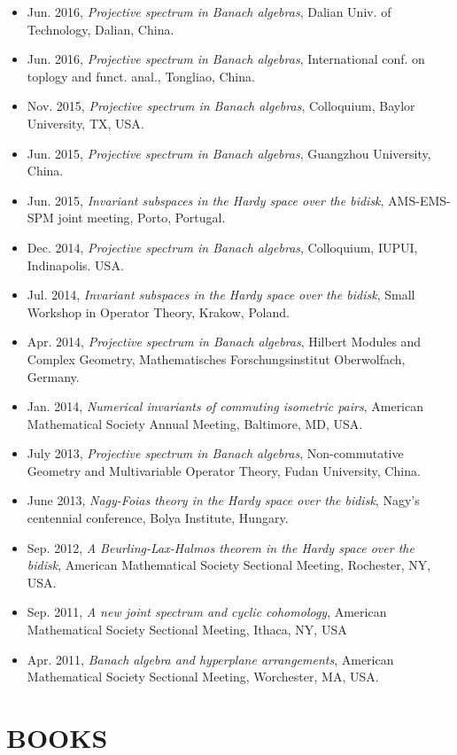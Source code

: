 \documentclass[12pt]{res} %
\begin{document}
\begin{resume}
\begin{itemize}
\item Jun. 2016, {\em Projective spectrum in Banach algebras}, Dalian Univ. of Technology, Dalian, China.
\item Jun. 2016, {\em Projective spectrum in Banach algebras}, International conf. on toplogy and funct. anal., Tongliao, China.
\item Nov. 2015, {\em Projective spectrum in Banach algebras}, Colloquium, Baylor University, TX, USA.
\item Jun. 2015, {\em Projective spectrum in Banach algebras}, Guangzhou University, China.
\item Jun. 2015, {\em Invariant subspaces in the Hardy space over the bidisk}, AMS-EMS-SPM joint meeting, Porto, Portugal.
\item Dec. 2014, {\em Projective spectrum in Banach algebras}, Colloquium, IUPUI, Indinapolis. USA.
\item Jul. 2014, {\em Invariant subspaces in the Hardy space over the bidisk}, Small Workshop in Operator Theory, Krakow, Poland.
\item Apr. 2014, {\em Projective spectrum in Banach algebras}, Hilbert Modules and Complex Geometry, Mathematisches Forschungsinstitut Oberwolfach, Germany.  
\item Jan. 2014, {\em Numerical invariants of commuting isometric pairs}, American Mathematical Society Annual Meeting, Baltimore, MD, USA.
\item July 2013, {\em Projective spectrum in Banach algebras}, Non-commutative Geometry and Multivariable Operator Theory, Fudan University, China.
\item June 2013, {\em Nagy-Foias theory in the Hardy space over the bidisk}, Nagy's centennial conference, Bolya Institute, Hungary.
\item Sep. 2012, {\em A Beurling-Lax-Halmos theorem in the Hardy space over the bidisk}, American Mathematical Society Sectional Meeting, Rochester, NY, USA.
\item Sep. 2011, {\em A new joint spectrum and cyclic cohomology}, American Mathematical Society Sectional Meeting, Ithaca, NY, USA
\item Apr. 2011, {\em Banach algebra and hyperplane arrangements}, American Mathematical Society Sectional Meeting, Worchester, MA, USA.
\end{itemize}

\section{BOOKS}


\end{resume}
\end{document}
